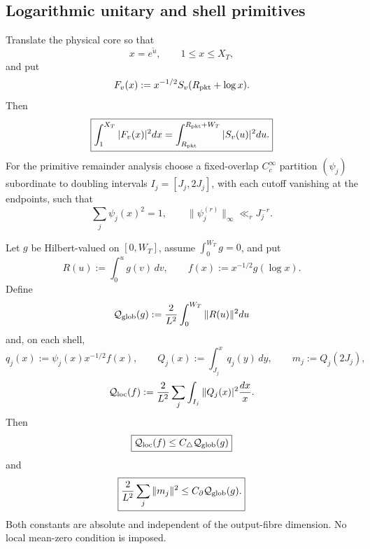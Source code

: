 \subsection{Logarithmic unitary and shell primitives}

Translate the physical core so that
\[
x=e^{\widetilde u},\qquad 1\le x\le X_T,
\]
and put
\begin{equation}
F_v(x):=x^{-1/2}S_v(R_{\rm pkt}+\log x).
\label{eq:log-unitary}
\end{equation}
Then
\begin{equation}
\boxed{
\int_1^{X_T}|F_v(x)|^2dx
=\int_{R_{\rm pkt}}^{R_{\rm pkt}+W_T}|S_v(u)|^2du.
}
\label{eq:log-unitary-norm}
\end{equation}
For the primitive remainder analysis choose a fixed-overlap $C_c^\infty$
partition $(\psi_j)$ subordinate to doubling intervals
$I_j=[J_j,2J_j]$, with each cutoff vanishing at the endpoints, such that
\begin{equation}
\boxed{
\sum_j\psi_j(x)^2=1,
\qquad \|\psi_j^{(r)}\|_\infty\ll_rJ_j^{-r}.
}
\label{eq:smooth-shell-partition}
\end{equation}

\begin{lemma}
\label{lem:global-local-triangular}
Let $g$ be Hilbert-valued on $[0,W_T]$, assume $\int_0^{W_T}g=0$, and put
\[
R(u):=\int_0^u g(v)\,dv,
\qquad
f(x):=x^{-1/2}g(\log x).
\]
Define
\begin{equation}
\mathcal Q_{\rm glob}(g)
:=\frac{2}{L^2}\int_0^{W_T}\|R(u)\|^2du
\label{eq:global-triangular-log}
\end{equation}
and, on each shell,
\[
q_j(x):=\psi_j(x)x^{-1/2}f(x),
\qquad
Q_j(x):=\int_{J_j}^xq_j(y)\,dy,
\qquad m_j:=Q_j(2J_j),
\]
\begin{equation}
\mathcal Q_{\rm loc}(f)
:=\frac{2}{L^2}\sum_j\int_{I_j}\|Q_j(x)|^2\frac{dx}{x}.
\label{eq:local-triangular-shell}
\end{equation}
Then
\begin{equation}
\boxed{\mathcal Q_{\rm loc}(f)\le C_\triangle\mathcal Q_{\rm glob}(g)}
\label{eq:global-local-triangular-comparison}
\end{equation}
and
\begin{equation}
\boxed{\frac2{L^2}\sum_j\|m_j\|^2
\le C_\partial\mathcal Q_{\rm glob}(g).}
\label{eq:global-local-endpoint-comparison}
\end{equation}
Both constants are absolute and independent of the output-fibre dimension.
No local mean-zero condition is imposed.
\end{lemma}

